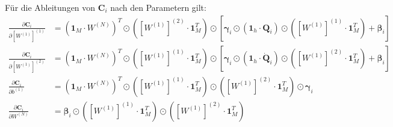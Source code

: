 \documentclass[a4paper, 12pt]{scrartcl}
\begin{document}
Für die Ableitungen von $\bm{C}_i$ nach den Parametern gilt: 
\begin{align*} 
    \frac{\partial \bm{C}_i}{\partial \left[W^{(1)}\right]^{(1)}}
    &=
    \left(\bm{1}_M \cdot W^{(N)}\right)^T
    \odot 
    \left(\left[W^{(1)}\right]^{(2)} \cdot \bm{1}_M^T \right)
    \odot
    \left[
        \bm{\gamma}_i 
        \odot 
        (\bm{1}_h \cdot \bm{Q}_i) 
        \odot 
        \left(\left[W^{(1)}\right]^{(1)} \cdot \bm{1}_M^T \right)
        + \bm{\beta}_i
    \right] 
    \\
    \frac{\partial \bm{C}_i}{\partial \left[W^{(1)}\right]^{(2)}}
    &=
    \left(\bm{1}_M \cdot W^{(N)}\right)^T
    \odot 
    \left(\left[W^{(1)}\right]^{(1)} \cdot \bm{1}_M^T \right)
    \odot
    \left[
        \bm{\gamma}_i 
        \odot 
        (\bm{1}_h \cdot \bm{\dot{Q}}_i) 
        \odot 
        \left(\left[W^{(1)}\right]^{(2)} \cdot \bm{1}_M^T \right)
        + \bm{\beta}_i
    \right] 
    \\
    \frac{\partial \bm{C}_i}{\partial b^{(1)}}
    &=
    \left(\bm{1}_M \cdot W^{(N)}\right)^T
    \odot 
    \left(\left[W^{(1)}\right]^{(1)} \cdot \bm{1}_M^T \right)
    \odot
    \left(\left[W^{(1)}\right]^{(2)} \cdot \bm{1}_M^T \right)
    \odot
    \bm{\gamma}_i
    \\
    \frac{\partial \bm{C}_i}{\partial W^{(N)}}
    &=
    \bm{\beta}_i
    \odot
    \left(\left[W^{(1)}\right]^{(1)} \cdot \bm{1}_M^T \right)
    \odot
    \left(\left[W^{(1)}\right]^{(2)} \cdot \bm{1}_M^T \right)
\end{align*}
\end{document}
